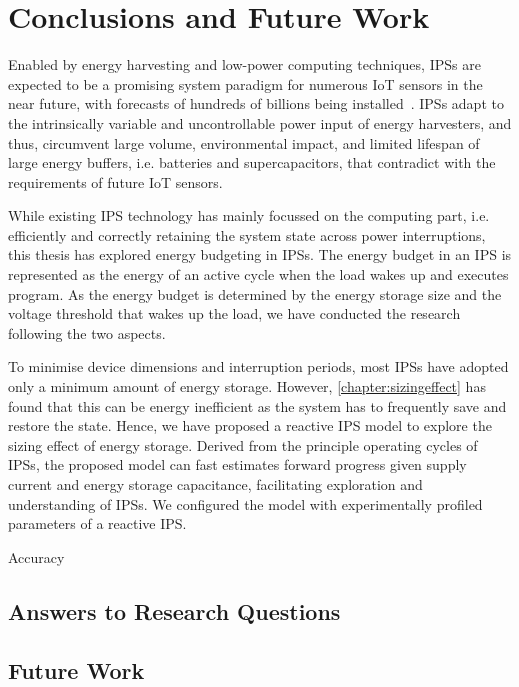 \chapter{Conclusions and Future Work} \label{chapter:conclusion}

Enabled by energy harvesting and low-power computing techniques, IPSs are expected to be a promising system paradigm for numerous IoT sensors in the near future, with forecasts of hundreds of billions being installed~\cite{sparks2017trillion}.
IPSs adapt to the intrinsically variable and uncontrollable power input of energy harvesters, and thus, circumvent large volume, environmental impact, and limited lifespan of large energy buffers, i.e. batteries and supercapacitors, that contradict with the requirements of future IoT sensors.

While existing IPS technology has mainly focussed on the computing part, i.e. efficiently and correctly retaining the system state across power interruptions, this thesis has explored energy budgeting in IPSs. 
The energy budget in an IPS is represented as the energy of an active cycle when the load wakes up and executes program. 
As the energy budget is determined by the energy storage size and the voltage threshold that wakes up the load, we have conducted the research following the two aspects. 

To minimise device dimensions and interruption periods, most IPSs have adopted only a minimum amount of energy storage. 
However, \cref{chapter:sizingeffect} has found that this can be energy inefficient as the system has to frequently save and restore the state. 
Hence, we have proposed a reactive IPS model to explore the sizing effect of energy storage. 
Derived from the principle operating cycles of IPSs, the proposed model can fast estimates forward progress given supply current and energy storage capacitance, facilitating exploration and understanding of IPSs. 
We configured the model with experimentally profiled parameters of a reactive IPS. 

Accuracy

\section{Answers to Research Questions}

\section{Future Work}

